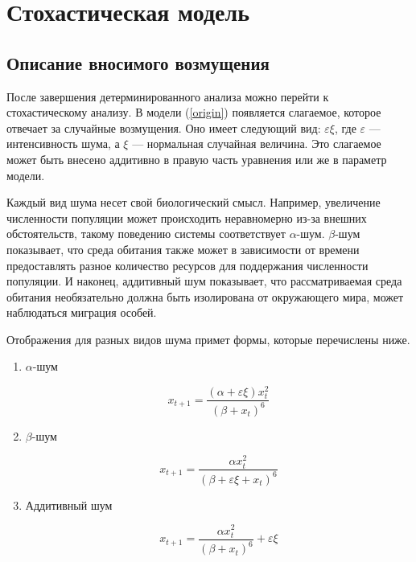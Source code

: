 \section{Стохастическая модель}

    \subsection{Описание вносимого возмущения}

        После завершения детерминированного анализа можно перейти к стохастическому анализу. В модели (\ref{origin}) появляется слагаемое, которое отвечает за случайные возмущения. Оно имеет следующий вид: \(\varepsilon \xi\), где \(\varepsilon\) --- интенсивность шума, а \(\xi\) --- нормальная случайная величина. Это слагаемое может быть внесено аддитивно в правую часть уравнения или же в параметр модели. 
        
        Каждый вид шума несет свой биологический смысл. Например, увеличение численности популяции может происходить неравномерно из-за внешних обстоятельств, такому поведению системы соответствует \(\alpha\)-шум. \(\beta\)-шум показывает, что среда обитания также может в зависимости от времени предоставлять разное количество ресурсов для поддержания численности популяции. И наконец, аддитивный шум показывает, что рассматриваемая среда обитания необязательно должна быть изолирована от окружающего мира, может наблюдаться миграция особей.
        
        Отображения для разных видов шума примет формы, которые перечислены ниже.

        \begin{enumerate}
            \item \(\alpha\)-шум

                \begin{equation}
                    \label{alpha_chaos}
                    x_{t + 1} = \frac{(\alpha + \varepsilon \xi) x_t^2}{(\beta + x_t)^6}
                \end{equation}
    
            \item \(\beta\)-шум
    
                \begin{equation}
                    \label{beta_chaos}
                    x_{t + 1} = \frac{\alpha x_t^2}{(\beta + \varepsilon \xi + x_t)^6}
                \end{equation}
    
            \item Аддитивный шум
    
                \begin{equation}
                    \label{additive_chaos}
                    x_{t + 1} = \frac{\alpha x_t^2}{(\beta + x_t)^6} + \varepsilon \xi
                \end{equation}
        \end{enumerate}

